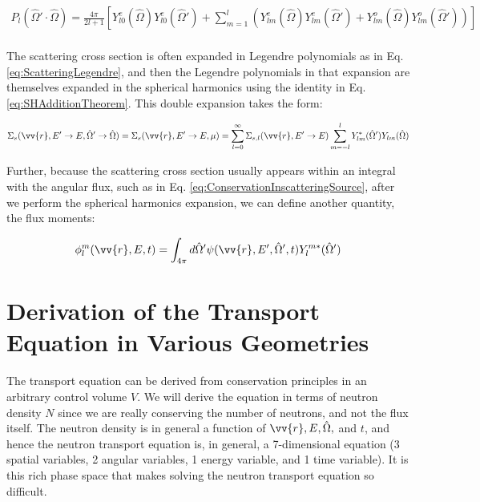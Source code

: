 \documentclass[10pt]{article}
\newcommand{\hO}{\hat{\Omega}}
\begin{document}
\begin{flushleft}
\begin{equation}
\begin{aligned}
\label{eq:FullExpansion5}
P_l(\hO  '\cdot\hO  )=\frac{4\pi}{2l+1}\left\lbrack Y_{l0}^e(\hO  )Y_{l0}^e(\hO  ')+\sum_{m=1}^{l}\left(Y_{lm}^e(\hO  )Y_{lm}^{e}(\hO  ')+Y_{lm}^o(\hO  )Y_{lm}^{o}(\hO  ')\right)\right\rbrack\\
\end{aligned}
\end{equation}





The scattering cross section is often expanded in Legendre polynomials as in Eq. \ref{eq:ScatteringLegendre}, and then the Legendre polynomials in that expansion are themselves expanded in the spherical harmonics using the identity in Eq. \ref{eq:SHAdditionTheorem}. This double expansion takes the form:

\begin{equation}
\label{eq:ScatteringLegendreandSH}
\Sigma_s(\vv{r}, E'\rightarrow E, \hO  '\rightarrow\hO  ) = \Sigma_s(\vv{r}, E'\rightarrow E, \mu) = \sum_{l=0}^{\infty} \Sigma_{s,l}(\vv{r}, E'\rightarrow E) \sum_{m=-l}^{l} Y_{lm}^{*} (\hO  ') Y_{lm}(\hO  )
\end{equation}

Further, because the scattering cross section usually appears within an integral with the angular flux, such as in Eq. \ref{eq:ConservationInscatteringSource}, after we perform the spherical harmonics expansion, we can define another quantity, the flux moments:

\begin{equation}
\label{eq:FluxMomentSH}
\phi_l^m(\vv{r}, E, t) = \int_{4\pi}^{} d\hO  '\psi(\vv{r}, E', \hO  ', t)Y_l^{m*}(\hO  ')
\end{equation}

\section{Derivation of the Transport Equation in Various Geometries}

The transport equation can be derived from conservation principles in an arbitrary control volume \(V\). We will derive the equation in terms of neutron density \(N\) since we are really conserving the number of neutrons, and not the flux itself. The neutron density is in general a function of \(\vv{r}, E, \hO  , \) and \(t\), and hence the neutron transport equation is, in general, a 7-dimensional equation (3 spatial variables, 2 angular variables, 1 energy variable, and 1 time variable). It is this rich phase space that makes solving the neutron transport equation so difficult. 


\end{flushleft}
\end{document}
